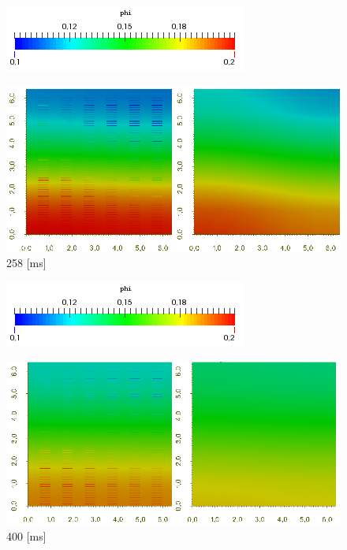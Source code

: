 \documentclass[11pt,spanish]{beamer}
\begin{document}
\begin{frame}
\begin{figure}[H]
\centering
\includegraphics[height = 0.9 cm]{fig/theorem_verification_r2_exp2_colorbar}
\end{figure}
\begin{figure}[H]
\centering
\includegraphics[height = 5 cm]{fig/theorem_verification_r2_exp2_258ms}
\caption{258 [ms]}
\end{figure}
\end{frame}

\begin{frame}
\begin{figure}[H]
\centering
\includegraphics[height = 0.9 cm]{fig/theorem_verification_r2_exp2_colorbar}
\end{figure}
\begin{figure}[H]
\centering
\includegraphics[height = 5 cm]{fig/theorem_verification_r2_exp2_400ms}
\caption{400 [ms]}
\end{figure}
\end{frame}
\end{document}
